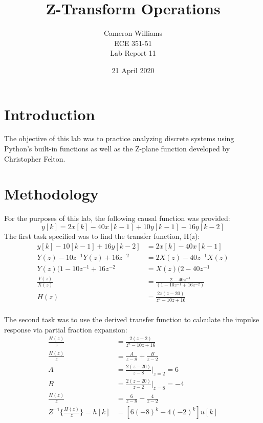\documentclass[12pt]{article}
\title{Z-Transform Operations}
\author{Cameron Williams\\ECE 351-51\\Lab Report 11}
\date{21 April 2020}
\begin{document}
\vspace{\fill}
\maketitle
\vspace{\fill}
\clearpage

\newpage
\section{Introduction}
    \par The objective of this lab was to practice analyzing discrete systems using Python's built-in functions as well as the Z-plane function developed by Christopher Felton.

\section{Methodology}
For the purposes of this lab, the following causal function was provided:
    $$ y[k] = 2x[k] - 40x[k-1] + 10y[k-1] - 16y[k-2] $$
The first task specified was to find the transfer function, H(z):
    \begin{align*}
        y[k] - 10[k-1] + 16y[k-2] &= 2x[k] - 40x[k-1] \\
        Y(z) - 10z^{-1}Y(z) + 16z^{-2} &= 2X(z) - 40z^{-1}X(z) \\
        Y(z)(1 - 10z^{-1} + 16z^{-2} &= X(z)(2 - 40z^{-1} \\
        \frac{Y(z)}{X(z)} &= \frac{2 - 40z^{-1}}{(1-10z^{-1}+16z^{-2})} \\
        H(z) &=\frac{2z(z-20)}{z^2 - 10z + 16} \\
    \end{align*}
    
The second task was to use the derived transfer function to calculate the impulse response via partial fraction expansion:
    \begin{align*}
        \frac{H(z)}{z} &= \frac{2(z-2)}{z^2 - 10z +16} \\
        \frac{H(z)}{z} &= \frac{A}{z-8} + \frac{B}{z-2} \\
        A &= \frac{2(z-20)}{z-8}|_{z=2} = 6 \\
        B &= \frac{2(z-20)}{z-2}|_{z=8} = -4 \\
        \frac{H(z)}{z} &= \frac{6}{z-8} - \frac{4}{z-2} \\
        Z^{-1}\{\frac{H(z)}{z}\} = h[k] &= [6(-8)^k - 4(-2)^k]u[k] \\
    \end{align*}
    
\end{document}

